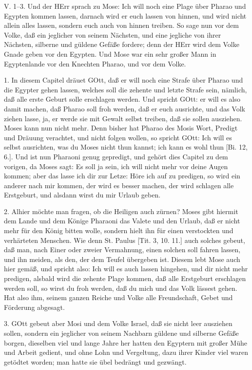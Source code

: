\begin{schriftzitat}
V. 1–3. Und der HErr sprach zu Mose: Ich will noch eine Plage über Pharao und Egypten kommen lassen, darnach wird er euch lassen von hinnen, und wird nicht allein alles lassen, sondern euch auch von hinnen treiben. So sage nun vor dem Volke, daß ein jeglicher von seinem Nächsten, und eine jegliche von ihrer Nächsten, silberne und güldene Gefäße fordere; denn der HErr wird dem Volke Gnade geben vor den Egypten. Und Mose war ein sehr großer Mann in Egyptenlande vor den Knechten Pharao, und vor dem Volke.
\end{schriftzitat}

1. In diesem Capitel dräuet GOtt, daß er will noch eine Strafe über Pharao und die Egypter gehen lassen, welches soll die zehente und letzte Strafe sein, nämlich, daß alle erste Geburt solle erschlagen werden. Und spricht GOtt: er will es also damit machen, daß Pharao soll froh werden, daß er euch ausrichte, und das Volk ziehen lasse, ja, er werde sie mit Gewalt selbst treiben, daß sie sollen ausziehen. Moses kann nun nicht mehr. Denn bisher hat Pharao des Mosis Wort, Predigt und Dräuung verachtet, und nicht folgen wollen, so spricht GOtt: Ich will es selbst ausrichten, was du Moses nicht thun kannst; ich kann es wohl thun [Bi. 12, 6.]. Und ist nun Pharaoni genug gepredigt, und gehört dies Capitel zu dem vorigen, da Moses sagt: Es soll ja sein, ich will nicht mehr vor deine Augen kommen; aber das lasse ich dir zur Letze: Höre ich auf zu predigen, so wird ein anderer nach mir kommen, der wird es besser machen, der wird schlagen alle Erstgeburt, und alsdann wirst du mir Urlaub geben.

2. Alhier möchte man fragen, ob die Heiligen auch zürnen? Moses gibt hiermit dem Lande und dem Könige Pharaoni das Valete und den Urlaub, daß er nicht mehr für den König bitten wolle, sondern hielt ihn für einen verstockten und verhärteten Menschen. Wie denn St. Paulus [Tit. 3, 10. 11.] auch solches gebeut, daß man, nach Einer oder zweier Vermahnung, einen solchen soll fahren lassen, und ihn meiden, als den, der dem Teufel übergeben ist. Diesem lebt Mose auch hier gemäß, und spricht also: Ich will es auch lassen hingehen, und dir nicht mehr predigen, alsbald wird die zehente Plage kommen, daß alle Erstgeburt erschlagen werden soll, so wirst du froh werden, daß du mich und das Volk lässest gehen. Hat also ihm, seinem ganzen Reiche und Volke alle Freundschaft, Gebet und Förderung abgesagt.

3. GOtt gebeut aber Mosi und dem Volke Israel, daß sie nicht leer ausziehen sollen, sondern ein jeglicher von seinem Nachbarn güldene und silberne Gefäße borgen, dieselben viel und lange Jahre her hatten den Egyptern mit großer Mühe und Arbeit gedient, und ohne Lohn und Vergeltung, dazu ihrer Kinder viel waren getödtet worden; man hatte sie übel bedrängt und gezwängt.

